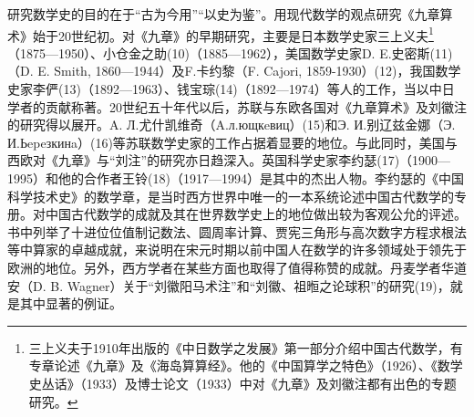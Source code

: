 \documentclass[a4paper,12pt,UTF8,twoside]{ctexbook}
\begin{document}
研究数学史的目的在于“古为今用”“以史为鉴”。用现代数学的观点研究《九章算术》始于20世纪初。对《九章》的早期研究，主要是日本数学史家三上义夫\footnote{三上义夫于1910年出版的《中日数学之发展》第一部分介绍中国古代数学，有专章论述《九章》及《海岛算算经》。他的《中国算学之特色》（1926）、《数学史丛话》（1933）及博士论文（1933）中对《九章》及刘徽注都有出色的专题研究。}（1875—1950）、小仓金之助(10)（1885—1962），美国数学史家D. E.史密斯(11)（D. E. Smith, 1860—1944）及F.卡约黎（F. Cajori, 1859-1930）(12)，我国数学史家李俨(13)（1892—1963）、钱宝琮(14)（1892—1974）等人的工作，当以中日学者的贡献称著。20世纪五十年代以后，苏联与东欧各国对《九章算术》及刘徽注的研究得以展开。A. Л.尤什凯维奇（A.л.ющкeвиц）(15)和Э. И.别辽兹金娜（Э. И.Ьepeзкинa）(16)等苏联数学史家的工作占据着显要的地位。与此同时，美国与西欧对《九章》与“刘注”的研究亦日趋深入。英国科学史家李约瑟(17)（1900—1995）和他的合作者王铃(18)（1917—1994）是其中的杰出人物。李约瑟的《中国科学技术史》的数学章，是当时西方世界中唯一的一本系统论述中国古代数学的专册。对中国古代数学的成就及其在世界数学史上的地位做出较为客观公允的评述。书中列举了十进位位值制记数法、圆周率计算、贾宪三角形与高次数字方程求根法等中算家的卓越成就，来说明在宋元时期以前中国人在数学的许多领域处于领先于欧洲的地位。另外，西方学者在某些方面也取得了值得称赞的成就。丹麦学者华道安（D. B. Wagner）关于“刘徽阳马术注”和“刘徽、祖暅之论球积”的研究(19)，就是其中显著的例证。
\end{document}
